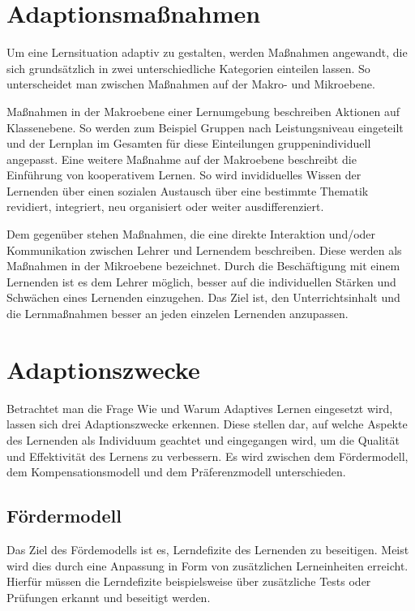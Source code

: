 \section{Adaptionsmaßnahmen}
Um eine Lernsituation adaptiv zu gestalten, werden Maßnahmen angewandt, die sich grundsätzlich in zwei
unterschiedliche Kategorien einteilen lassen. So unterscheidet man zwischen Maßnahmen auf der Makro- und Mikroebene.

Maßnahmen in der Makroebene einer Lernumgebung beschreiben Aktionen auf Klassenebene.
So werden zum Beispiel Gruppen nach Leistungsniveau eingeteilt und der Lernplan im Gesamten für
diese Einteilungen gruppenindividuell angepasst. Eine weitere Maßnahme auf der Makroebene beschreibt
die Einführung von kooperativem Lernen. So wird invididuelles Wissen der Lernenden über einen sozialen Austausch
über eine bestimmte Thematik revidiert, integriert, neu organisiert oder weiter ausdifferenziert.

Dem gegenüber stehen Maßnahmen, die eine direkte Interaktion und/oder Kommunikation zwischen Lehrer und Lernendem beschreiben.
Diese werden als Maßnahmen in der Mikroebene bezeichnet. Durch die Beschäftigung mit einem Lernenden
ist es dem Lehrer möglich, besser auf die individuellen Stärken und Schwächen eines Lernenden einzugehen.
Das Ziel ist, den Unterrichtsinhalt und die Lernmaßnahmen besser an jeden einzelen Lernenden anzupassen.

\section{Adaptionszwecke}
Betrachtet man die Frage Wie und Warum Adaptives Lernen eingesetzt wird, lassen sich drei Adaptionszwecke erkennen.
Diese stellen dar, auf welche Aspekte des Lernenden als Individuum geachtet und eingegangen wird, um die
Qualität und Effektivität des Lernens zu verbessern.
Es wird zwischen dem Fördermodell, dem Kompensationsmodell und dem Präferenzmodell unterschieden.

\subsection{Fördermodell}
Das Ziel des Fördemodells ist es, Lerndefizite des Lernenden zu beseitigen.
Meist wird dies durch eine Anpassung in Form von zusätzlichen Lerneinheiten erreicht.
Hierfür müssen die Lerndefizite beispielsweise über zusätzliche Tests oder Prüfungen erkannt
und beseitigt werden. \cite[S. 19]{lehmann2010lernstile}

